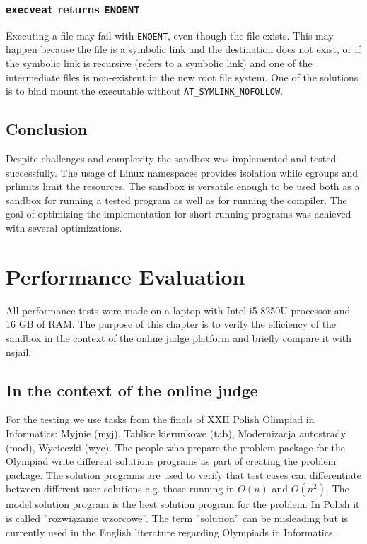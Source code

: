 \documentclass[en]{pracamgr}
\begin{document}
\subsection{\texttt{execveat} returns \texttt{ENOENT}} \label{execveat_returns_enoent}

Executing a file may fail with \texttt{ENOENT}, even though the file exists. This may happen because the file is a symbolic link and the destination does not exist, or if the symbolic link is recursive (refers to a symbolic link) and one of the intermediate files is non-existent in the new root file system. One of the solutions is to bind mount the executable without \texttt{AT\_SYMLINK\_NOFOLLOW}.

\section{Conclusion}

Despite challenges and complexity the sandbox was implemented and tested successfully. The usage of Linux namespaces provides isolation while cgroups and prlimits limit the resources. The sandbox is versatile enough to be used both as a sandbox for running a tested program as well as for running the compiler. The goal of optimizing the implementation for short-running programs was achieved with several optimizations.


\chapter{Performance Evaluation}\label{chapter:performance}

All performance tests were made on a laptop with Intel i5-8250U processor and 16 GB of RAM. The purpose of this chapter is to verify the efficiency of the sandbox in the context of the online judge platform and briefly compare it with nsjail.

\section{In the context of the online judge}

For the testing we use tasks from the finals of XXII Polish Olimpiad in Informatics: Myjnie (myj), Tablice kierunkowe (tab), Modernizacja autostrady (mod), Wycieczki (wyc). The people who prepare the problem package for the Olympiad write different solutions programs as part of creating the problem package. The solution programs are used to verify that test cases can differentiate between different user solutions e.g. those running in $O(n)$ and $O(n^2)$. The model solution program is the best solution program for the problem. In Polish it is called ''rozwiązanie wzorcowe''. The term ''solution'' can be misleading but is currently used in the English literature regarding Olympiads in Informatics~\cite{kolstad2009infrastructure, marevs2012new, merry2010performance, merry2009using}.
\end{document}
